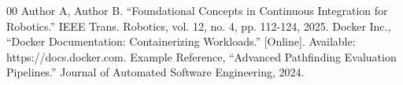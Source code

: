 \documentclass[conference]{IEEEtran}
\begin{document}
\begin{thebibliography}{00}
 Author A, Author B. ``Foundational Concepts in Continuous Integration for Robotics.'' IEEE Trans. Robotics, vol. 12, no. 4, pp. 112-124, 2025.
 Docker Inc., ``Docker Documentation: Containerizing Workloads.'' [Online]. Available: https://docs.docker.com.
 Example Reference, ``Advanced Pathfinding Evaluation Pipelines.'' Journal of Automated Software Engineering, 2024.
\end{thebibliography}
\end{document}
